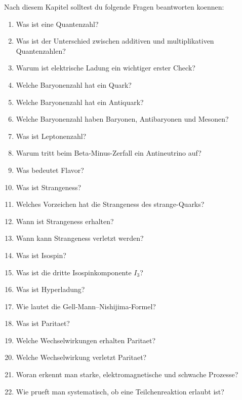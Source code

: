\begin{examtipbox}
Nach diesem Kapitel solltest du folgende Fragen beantworten koennen:
\begin{enumerate}
    \item Was ist eine Quantenzahl?
    \item Was ist der Unterschied zwischen additiven und multiplikativen Quantenzahlen?
    \item Warum ist elektrische Ladung ein wichtiger erster Check?
    \item Welche Baryonenzahl hat ein Quark?
    \item Welche Baryonenzahl hat ein Antiquark?
    \item Welche Baryonenzahl haben Baryonen, Antibaryonen und Mesonen?
    \item Was ist Leptonenzahl?
    \item Warum tritt beim Beta-Minus-Zerfall ein Antineutrino auf?
    \item Was bedeutet Flavor?
    \item Was ist Strangeness?
    \item Welches Vorzeichen hat die Strangeness des strange-Quarks?
    \item Wann ist Strangeness erhalten?
    \item Wann kann Strangeness verletzt werden?
    \item Was ist Isospin?
    \item Was ist die dritte Isospinkomponente $I_3$?
    \item Was ist Hyperladung?
    \item Wie lautet die Gell-Mann--Nishijima-Formel?
    \item Was ist Paritaet?
    \item Welche Wechselwirkungen erhalten Paritaet?
    \item Welche Wechselwirkung verletzt Paritaet?
    \item Woran erkennt man starke, elektromagnetische und schwache Prozesse?
    \item Wie prueft man systematisch, ob eine Teilchenreaktion erlaubt ist?
\end{enumerate}
\end{examtipbox}